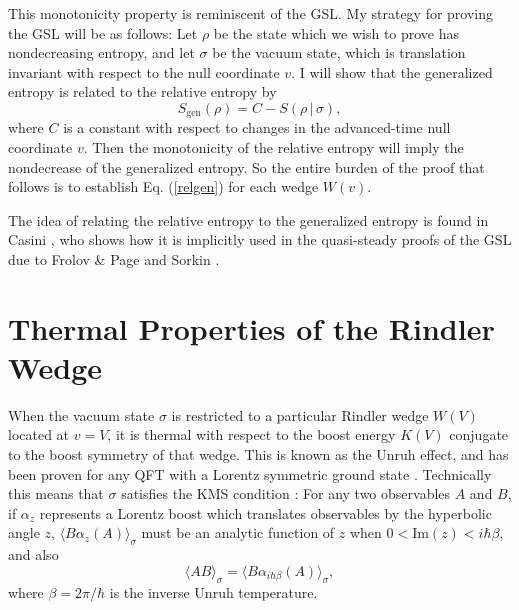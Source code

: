 \documentclass[12pt]{article}
\begin{document}
This monotonicity property is reminiscent of the GSL.  My strategy for proving the GSL will be as follows: Let $\rho$ be the state which we wish to prove has nondecreasing entropy, and let $\sigma$ be the vacuum state, which is translation invariant with respect to the null coordinate $v$.  I will show that the generalized entropy is related to the relative entropy by
\begin{equation}\label{relgen}
S_\mathrm{gen}(\rho) = C - S(\rho\,|\,\sigma),
\end{equation}
where $C$ is a constant with respect to changes in the advanced-time null coordinate $v$.  Then the monotonicity of the relative entropy will imply the nondecrease of the generalized entropy.  So the entire burden of the proof that follows is to establish Eq. (\ref{relgen}) for each wedge $W(v)$.

The idea of relating the relative entropy to the generalized entropy is found in Casini \cite{casini08}, who shows how it is implicitly used in the quasi-steady proofs of the GSL due to Frolov \& Page \cite{FP93} and Sorkin \cite{sorkin98}.

\section{Thermal Properties of the Rindler Wedge}\label{thermal}

When the vacuum state $\sigma$ is restricted to a particular Rindler wedge $W(V)$ located at $v = V$, it is thermal with respect to the boost energy $K(V)$ conjugate to the boost symmetry of that wedge.  This is known as the Unruh effect, and has been proven for any QFT with a Lorentz symmetric ground state \cite{BW76}.  Technically this means that $\sigma$ satisfies the KMS condition \cite{KMS}: For any two observables $A$ and $B$, if $\alpha_{z}$ represents a Lorentz boost which translates observables by the hyperbolic angle $z$, $\langle B \alpha_{z}(A) \rangle_{\sigma}$ must be an analytic function of $z$ when $0 < \textrm{Im}(z) < i \hbar \beta$, and also
\begin{equation}
\langle AB \rangle_{\sigma} = \langle B \alpha_{i \hbar \beta}(A) \rangle_{\sigma},
\end{equation}
where $\beta = 2\pi / \hbar$ is the inverse Unruh temperature.
\end{document}
